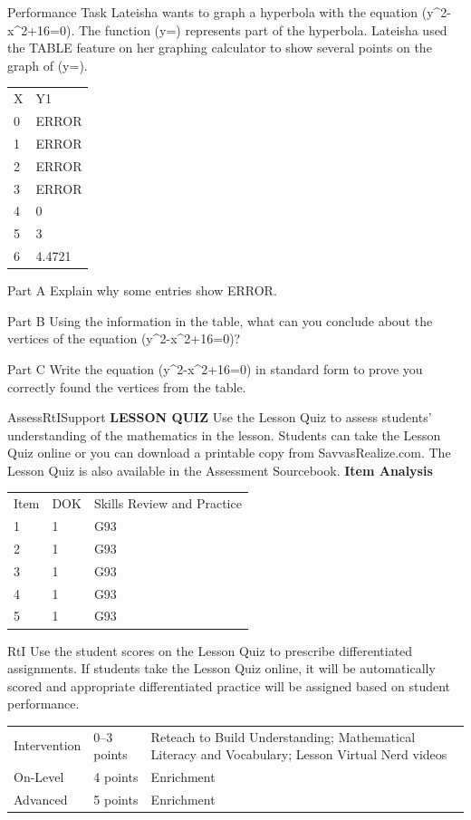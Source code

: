 \documentclass{article}
\newenvironment{practice}[2]{}{}        %
\newenvironment{te-addendum}[2]{}{}     %
\newcommand{\answer}[1]{}               %
\newcommand{\te}[1]{}                   %
\begin{document}
\begin{practice}{36}{3}
Performance Task Lateisha wants to graph a hyperbola with the equation (y^2-x^2+16=0). The function (y=) represents part of the hyperbola. Lateisha used the TABLE feature on her graphing calculator to show several points on the graph of (y=).
\begin{tabular}{ll}
X & Y1 \\
0 & ERROR \\
1 & ERROR \\
2 & ERROR \\
3 & ERROR \\
4 & 0 \\
5 & 3 \\
6 & 4.4721 \\
\end{tabular}
\te{Calculator cursor highlights X=0; status line X=0.}
Part A Explain why some entries show ERROR.
\answer{For x-values of 0, 1, 2, and 3, the expression (x^2-16) is negative. The square root of a negative number results in entries that show ERROR.}
Part B Using the information in the table, what can you conclude about the vertices of the equation (y^2-x^2+16=0)?
\answer{The table shows that ((4,0)) is a vertex of the equation (y^2-x^2+16=0). This means ((-4,0)) is also a vertex.}
Part C Write the equation (y^2-x^2+16=0) in standard form to prove you correctly found the vertices from the table.
\answer{(\frac{x^2}{16}-\frac{y^2}{16}=1); The value of (a^2) is 16, so (a=4). This means the vertices are at ((-4,0)) and ((4,0)).}
\end{practice}
\begin{te-addendum}{Assess}{RtISupport}
\textbf{LESSON QUIZ}
Use the Lesson Quiz to assess students' understanding of the mathematics in the lesson.
Students can take the Lesson Quiz online or you can download a printable copy from SavvasRealize.com. The Lesson Quiz is also available in the Assessment Sourcebook.
\textbf{Item Analysis}
\begin{tabular}{lll}
Item & DOK & Skills Review and Practice \\
1 & 1 & G93 \\
2 & 1 & G93 \\
3 & 1 & G93 \\
4 & 1 & G93 \\
5 & 1 & G93 \\
\end{tabular}
RtI Use the student scores on the Lesson Quiz to prescribe differentiated assignments.
If students take the Lesson Quiz online, it will be automatically scored and appropriate differentiated practice will be assigned based on student performance.
\begin{tabular}{lll}
Intervention & 0--3 points & Reteach to Build Understanding; Mathematical Literacy and Vocabulary; Lesson Virtual Nerd videos \\
On-Level & 4 points & Enrichment \\
Advanced & 5 points & Enrichment \\
\end{tabular}
\end{te-addendum}
\end{document}
